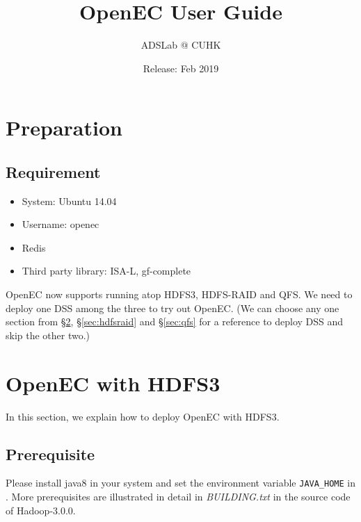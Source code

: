 \documentclass[letterpaper,12pt]{article}
\title{{\bf OpenEC User Guide}}
\author{ADSLab @ CUHK}
\date{Release: Feb 2019\\}
\newcommand{\openec}{{\sf\small OpenEC}\xspace}
\begin{document}
\maketitle


\tableofcontents

\clearpage

\section{Preparation}
\label{sec:installation}

\subsection{Requirement}

\begin{itemize}

\item System: Ubuntu 14.04

\item Username: openec

\item Redis
	
\item Third party library: ISA-L, gf-complete

\end{itemize}

\openec now supports running atop HDFS3, HDFS-RAID and QFS. We need to deploy
one DSS among the three to try out \openec. (We can choose any one section
from \S\ref{sec:hdfs3}, \S\ref{sec:hdfsraid} and \S\ref{sec:qfs} for a reference
to deploy DSS and skip the other two.)

\section{OpenEC with HDFS3}
\label{sec:hdfs3}

In this section, we explain how to deploy \openec with HDFS3.

\subsection{Prerequisite}

Please install java8 in your system and set the environment variable {\tt JAVA\_HOME} in
. More prerequisites are illustrated in detail in {\sl BUILDING.txt}
in the source code of Hadoop-3.0.0.
\end{document}
